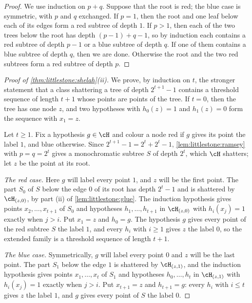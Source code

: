 \begin{refsection}
\begin{proof}
We use induction on $p+q$. Suppose that the root is red; the blue case is symmetric, with $p$ and $q$ exchanged. If $p=1$, then the root and one leaf below each of its edges form a red subtree of depth $1$. If $p>1$, then each of the two trees below the root has depth $(p-1)+q-1$, so by induction each contains a red subtree of depth $p-1$ or a blue subtree of depth $q$. If one of them contains a blue subtree of depth $q$, then we are done. Otherwise the root and the two red subtrees form a red subtree of depth $p$.
\end{proof}

\begin{proof}[Proof of \cref{thm:littlestone:shelah}(ii)]
We prove, by induction on $t$, the stronger statement that a class shattering a tree of depth $2^{t+1}-1$ contains a threshold sequence of length $t+1$ whose points are points of the tree. If $t=0$, then the tree has one node $z$, and two hypotheses with $h_0(z)=1$ and $h_1(z)=0$ form the sequence with $x_1=z$.

Let $t\ge1$. Fix a hypothesis $g\in\cH$ and colour a node red if $g$ gives its point the label $1$, and blue otherwise. Since $2^{t+1}-1=2^t+2^t-1$, \cref{lem:littlestone:ramsey} with $p=q=2^t$ gives a monochromatic subtree $S$ of depth $2^t$, which $\cH$ shatters; let $z$ be the point at its root.

\emph{The red case.} Here $g$ will label every point $1$, and $z$ will be the first point. The part $S_0$ of $S$ below the edge $0$ of its root has depth $2^t-1$ and is shattered by $\cH_{(z,0)}$, by part (ii) of \cref{lem:littlestone:glue}. The induction hypothesis gives points $x_2,\dots,x_{t+1}$ of $S_0$ and hypotheses $h_1,\dots,h_{t+1}$ in $\cH_{(z,0)}$ with $h_i(x_j)=1$ exactly when $j>i$. Put $x_1=z$ and $h_0=g$. The hypothesis $g$ gives every point of the red subtree $S$ the label $1$, and every $h_i$ with $i\ge1$ gives $z$ the label $0$, so the extended family is a threshold sequence of length $t+1$.

\emph{The blue case.} Symmetrically, $g$ will label every point $0$ and $z$ will be the last point. The part $S_1$ below the edge $1$ is shattered by $\cH_{(z,1)}$, and the induction hypothesis gives points $x_1,\dots,x_t$ of $S_1$ and hypotheses $h_0,\dots,h_t$ in $\cH_{(z,1)}$ with $h_i(x_j)=1$ exactly when $j>i$. Put $x_{t+1}=z$ and $h_{t+1}=g$: every $h_i$ with $i\le t$ gives $z$ the label $1$, and $g$ gives every point of $S$ the label $0$.
\end{proof}


\end{refsection}
